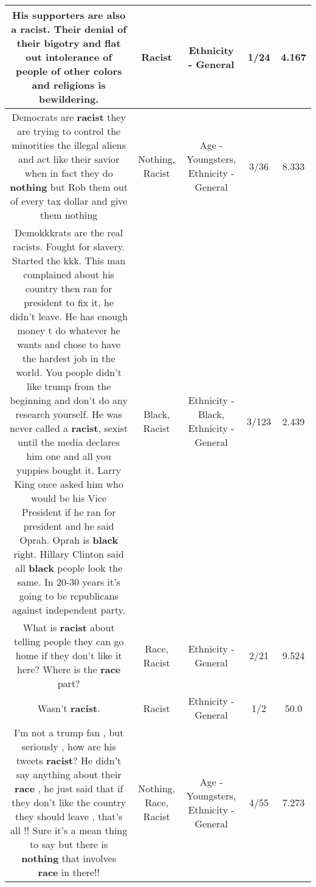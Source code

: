 \documentclass[11pt]{article}
\newlength\mylength
\begin{document}
\begin{center}
\begin{longtable}{|C{.65\mylength}|C{.30\mylength}|C{.12\mylength}|C{.12\mylength}|C{.12\mylength}|}
  \small His supporters are also a \textbf{racist}. Their denial of their bigotry and flat out intolerance of people of other colors and religions is bewildering.\normalsize   & Racist & Ethnicity - General & 1/24 & 4.167 \\  \hline
  \small Democrats are \textbf{racist} they are trying to control the minorities the illegal aliens and act like their savior when in fact they do \textbf{nothing} but Rob them out of every tax dollar and give them nothing\normalsize   & Nothing, Racist & Age - Youngsters, Ethnicity - General & 3/36 & 8.333 \\  \hline
  \small Demokkkrats are the real racists.  Fought for slavery. Started the kkk. This man complained about his country then ran for president to fix it, he didn't leave. He has enough money t do whatever he wants and chose to have the hardest job in the world. You people didn't like trump from the beginning and don't do any research yourself. He was never called a \textbf{racist}, sexist until the media declares him one and all you yuppies bought it. Larry King once asked him who would be his Vice President if he ran for president and he said Oprah. Oprah is \textbf{black} right. Hillary Clinton said all \textbf{black} people look the same. In 20-30 years it's going to be republicans against independent party.\normalsize   & Black, Racist & Ethnicity - Black, Ethnicity - General & 3/123 & 2.439 \\  \hline
  \small What is \textbf{racist} about telling people they can go home if they don't like it here?  Where is the \textbf{race} part?\normalsize   & Race, Racist & Ethnicity - General & 2/21 & 9.524 \\  \hline
  \small Wasn't \textbf{racist}.\normalsize   & Racist & Ethnicity - General & 1/2 & 50.0 \\  \hline
  \small I'm not a trump fan , but seriously , how are his tweets \textbf{racist}? He didn't say anything about their \textbf{race} , he just said that if they don't like the country they should leave , that's all !! Sure it's a mean thing to say but there is \textbf{nothing} that involves \textbf{race} in there!!\normalsize   & Nothing, Race, Racist & Age - Youngsters, Ethnicity - General & 4/55 & 7.273 \\  \hline

\end{longtable}
\end{center}
\end{document}
